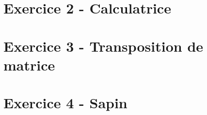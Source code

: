 \documentclass[12pt,a4paper]{article}
\begin{document}
\vspace*{0.7cm}



\newpage

\section{Exercice 2 - Calculatrice}

\vspace*{0.7cm}



\newpage

\section{Exercice 3 - Transposition de matrice}

\vspace*{0.7cm}



\newpage

\section{Exercice 4 - Sapin}

\vspace*{0.7cm}


\end{document}
